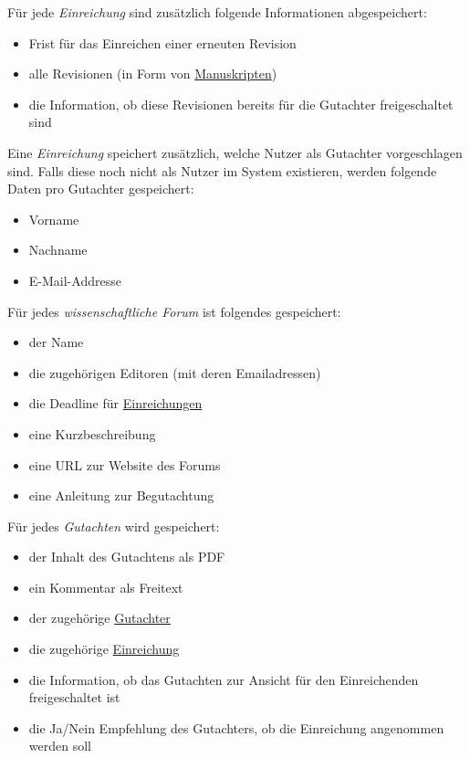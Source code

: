 \begin{description}
	 Für jede \emph{Einreichung} sind zusätzlich folgende Informationen abgespeichert:
	\begin{itemize}
		\item Frist für das Einreichen einer erneuten Revision
		\item alle Revisionen (in Form von \hyperref[d020]{Manuskripten})
		\item die Information, ob diese Revisionen bereits für die Gutachter freigeschaltet sind
	\end{itemize}

	 Eine \emph{Einreichung} speichert zusätzlich, welche Nutzer als Gutachter vorgeschlagen sind.
	Falls diese noch nicht als Nutzer im System existieren, werden folgende Daten pro Gutachter gespeichert:
	\begin{itemize}
		\item Vorname
		\item Nachname
		\item E-Mail-Addresse
	\end{itemize}

	 Für jedes \emph{wissenschaftliche Forum} ist folgendes gespeichert:
	\begin{itemize}
		\item der Name
		\item die zugehörigen Editoren (mit deren Emailadressen)
		\item die Deadline für \hyperref[d025]{Einreichungen}
		\item eine Kurzbeschreibung
		\item eine URL zur Website des Forums
		\item eine Anleitung zur Begutachtung
	\end{itemize}

	 Für jedes \emph{Gutachten} wird gespeichert:
	\begin{itemize}
		\item der Inhalt des Gutachtens als PDF
		\item ein Kommentar als Freitext
		\item der zugehörige \hyperref[funkt:Gutachter]{Gutachter}
		\item die zugehörige \hyperref[d025]{Einreichung}
		\item die Information, ob das Gutachten zur Ansicht für den Einreichenden freigeschaltet ist
		\item die Ja/Nein Empfehlung des Gutachters, ob die Einreichung angenommen werden soll
	\end{itemize}


\end{description}
